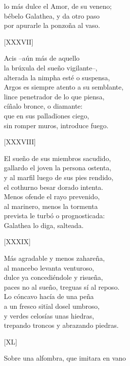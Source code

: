 \documentclass[11pt,a4paper,twoside]{article}
\begin{document}
lo más dulce el Amor, de su veneno;\\
bébelo Galathea, y da otro paso\\
por apurarle la ponzoña al vaso.\pend
\begin{center}
	[XXXVII]
\end{center}\pstart
Acis --aún más de aquello \\
la brúxula del sueño vigilante--,\\
alterada la nimpha esté o suspensa,\\
Argos es siempre atento a su semblante,\\
lince penetrador de lo que piensa,\\
cíñalo bronce, o  diamante:\\
que en sus palladïones  ciego,\\
sin romper muros, introduce fuego.\pend 
\begin{center}
	[XXXVIII]
\end{center}\pstart
El sueño de sus miembros sacudido,\\
gallardo el joven la persona ostenta,\\
y al marfil luego de sus pies rendido,\\
el cothurno besar dorado intenta.\\
Menos ofende el rayo prevenido,\\
al marinero, menos la tormenta\\
prevista le turbó o prognosticada:\\
Galathea lo diga, salteada.\pend 
\begin{center}
	[XXXIX]
\end{center}\pstart
Más agradable y menos zahareña,\\
al mancebo levanta venturoso,\\
dulce ya concediéndole y risueña,\\
paces no al sueño, treguas sí al reposo.\\
Lo cóncavo hacía de una peña\\
a un fresco sitïal dosel umbroso,\\
y verdes celosías unas hiedras,\\
trepando troncos y abrazando piedras.\pend
\begin{center}
	[XL]
\end{center}\pstart
Sobre una alfombra, que imitara en vano\\
\end{document}
